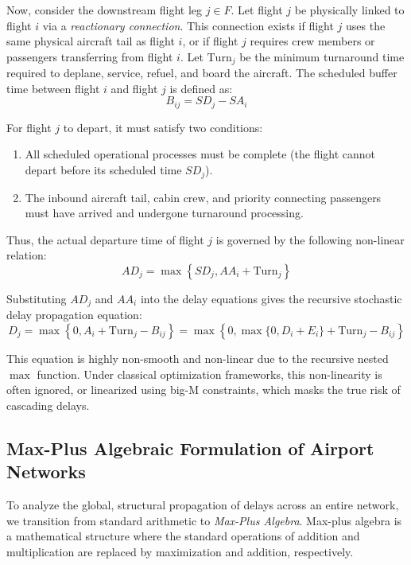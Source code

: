 \documentclass[11pt,a4paper]{book}
\begin{document}
Now, consider the downstream flight leg $j \in F$. Let flight $j$ be physically linked to flight $i$ via a \textit{reactionary connection}. This connection exists if flight $j$ uses the same physical aircraft tail as flight $i$, or if flight $j$ requires crew members or passengers transferring from flight $i$.
Let $\text{Turn}_j$ be the minimum turnaround time required to deplane, service, refuel, and board the aircraft. The scheduled buffer time between flight $i$ and flight $j$ is defined as:
\begin{equation}
B_{ij} = SD_j - SA_i
\end{equation}

For flight $j$ to depart, it must satisfy two conditions:
\begin{enumerate}
    \item All scheduled operational processes must be complete (the flight cannot depart before its scheduled time $SD_j$).
    \item The inbound aircraft tail, cabin crew, and priority connecting passengers must have arrived and undergone turnaround processing.
\end{enumerate}

Thus, the actual departure time of flight $j$ is governed by the following non-linear relation:
\begin{equation}
AD_j = \max\left\{ SD_j, AA_i + \text{Turn}_j \right\}
\end{equation}

Substituting $AD_j$ and $AA_i$ into the delay equations gives the recursive stochastic delay propagation equation:
\begin{equation}
D_j = \max\left\{ 0, A_i + \text{Turn}_j - B_{ij} \right\} = \max\left\{ 0, \max\{0, D_i + E_i\} + \text{Turn}_j - B_{ij} \right\}
\end{equation}

This equation is highly non-smooth and non-linear due to the recursive nested $\max$ function. Under classical optimization frameworks, this non-linearity is often ignored, or linearized using big-M constraints, which masks the true risk of cascading delays.

\subsection{Max-Plus Algebraic Formulation of Airport Networks}

To analyze the global, structural propagation of delays across an entire network, we transition from standard arithmetic to \textit{Max-Plus Algebra}. Max-plus algebra is a mathematical structure where the standard operations of addition and multiplication are replaced by maximization and addition, respectively.
\end{document}
